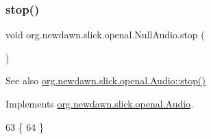 \subsubsection{\texorpdfstring{stop()}{stop()}}
{\footnotesize\ttfamily void org.\+newdawn.\+slick.\+openal.\+Null\+Audio.\+stop (\begin{DoxyParamCaption}{ }\end{DoxyParamCaption})\hspace{0.3cm}{\ttfamily [inline]}}

\begin{DoxySeeAlso}{See also}
\mbox{\hyperlink{interfaceorg_1_1newdawn_1_1slick_1_1openal_1_1_audio_a8346ca83b84cb6605efb695462f12337}{org.\+newdawn.\+slick.\+openal.\+Audio\+::stop()}} 
\end{DoxySeeAlso}


Implements \mbox{\hyperlink{interfaceorg_1_1newdawn_1_1slick_1_1openal_1_1_audio_a8346ca83b84cb6605efb695462f12337}{org.\+newdawn.\+slick.\+openal.\+Audio}}.


\begin{DoxyCode}
63                        \{
64     \}
\end{DoxyCode}
